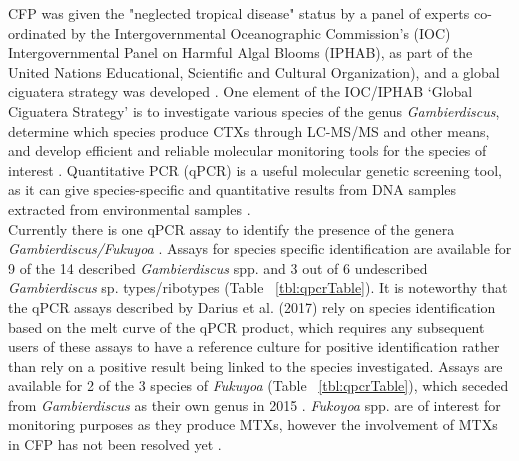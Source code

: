 \documentclass[12pt]{article}
\begin{document}
CFP was given the "neglected tropical disease" status by a panel of experts co-ordinated by the Intergovernmental Oceanographic Commission’s (IOC) Intergovernmental Panel on Harmful Algal Blooms (IPHAB), as part of the United Nations Educational, Scientific and Cultural Organization), and a global ciguatera strategy was developed \citep{globalcig}. 
One element of the IOC/IPHAB ‘Global Ciguatera Strategy’ is to  investigate various species of the genus \emph{Gambierdiscus}, determine which species produce CTXs through LC-MS/MS and other means, and develop efficient and reliable molecular monitoring tools for the species of interest \citep{globalcig}. 
Quantitative PCR (qPCR) is a useful molecular genetic screening tool, as it can give species-specific and quantitative results from DNA samples extracted from environmental samples \citep{globalcig}. \\
\FloatBarrier
\FloatBarrier
Currently there is one qPCR assay to identify the presence of the genera \emph{Gambierdiscus/Fukuyoa} \citep{smith2017molecular}. 
Assays for species specific identification are available for 9 of the 14 described \emph{Gambierdiscus} spp. and 3 out of 6 undescribed \emph{Gambierdiscus} sp. types/ribotypes (Table ~\ref{tbl:qpcrTable}). 
It is noteworthy that the qPCR assays described by Darius et al. (2017) rely on species identification based on the melt curve of the qPCR product, which requires any subsequent users of these assays to have a reference culture for positive identification rather than rely on a positive result being linked to the species investigated. 
Assays are available for 2 of the 3 species of \emph{Fukuyoa} (Table ~\ref{tbl:qpcrTable}), which seceded from \emph{Gambierdiscus} as their own genus in 2015 \citep{gomez2015fukuyoa}. 
\textit{Fukoyoa} spp. are of interest for monitoring purposes as they produce MTXs, however the involvement of MTXs in CFP has not been resolved yet \citep{kohli2014feeding}.
\end{document}

